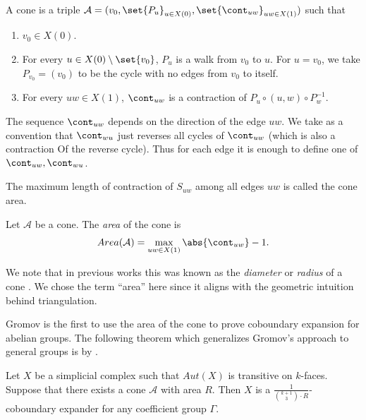 \begin{definition}[cone]
    A cone is a triple \(\mathcal{A}=(v_0,\set{P_u}_{u \in X(0)}, \set{\cont_{uw}}_{uw \in X(1)})\) such that
\begin{enumerate}
    \item \(v_0 \in X(0)\).
    \item For every \( u \in X(0)\setminus\set{v_0}\), \(P_{u}\) is a walk from \(v_0\) to \(u\). For \(u = v_0\), we take \(P_{v_0} = (v_0)\) to be the cycle with no edges from \(v_0\) to itself.
    \item For every \(uw \in X(1)\), \(\cont_{uw}\) is a contraction of \(P_{u} \circ (u,w) \circ P_w^{-1}\).
\end{enumerate}
\end{definition}
The sequence \(\cont_{uw}\) depends on the direction of the edge \(uw\). We take as a convention that \(\cont_{wu}\) just reverses all cycles of \(\cont_{uw}\) (which is also a contraction Of the reverse cycle). Thus for each edge it is enough to define one of \(\cont_{uw},\cont_{wu}\). 

The maximum length of contraction of \(S_{uw}\) among all edges \(uw\) is called the cone area.
\begin{definition}
    Let \(\mathcal{A}\) be a cone. The \emph{area} of the cone is
        \[Area(\mathcal{A}) = \max_{uw \in X(1)} \abs{\cont_{uw}}-1.\]
\end{definition}

We note that in previous works this was known as the \emph{diameter} or \emph{radius} of a cone \cite{KaufmanO2021,DiksteinD2023swap}. We chose the term ``area'' here since it aligns with the geometric intuition behind triangulation.

Gromov is the first to use  the area of the cone to prove coboundary expansion for abelian groups. 
The following theorem which generalizes Gromov's approach to general groups is by \cite{DiksteinD2023swap}.
\begin{theorem} \label{thm:group-and-cones}
    Let \(X\) be a simplicial complex such that \(Aut(X)\) is transitive on \(k\)-faces. Suppose that there exists a cone \(\mathcal{A}\) with area \(R\). Then \(X\) is a \(\frac{1}{\binom{k+1}{3}\cdot R}\)-coboundary expander for any coefficient group \(\Gamma\).
\end{theorem}

